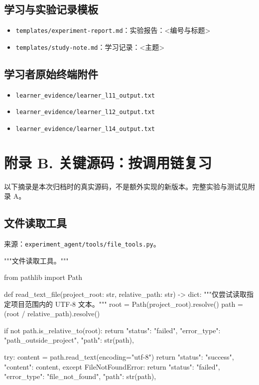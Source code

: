 \subsection{学习与实验记录模板}
\begin{itemize}
\item \nolinkurl{templates/experiment-report.md}：实验报告：<编号与标题>
\item \nolinkurl{templates/study-note.md}：学习记录：<主题>
\end{itemize}

\subsection{学习者原始终端附件}
\begin{itemize}
\item \nolinkurl{learner_evidence/learner_l11_output.txt}
\item \nolinkurl{learner_evidence/learner_l12_output.txt}
\item \nolinkurl{learner_evidence/learner_l14_output.txt}
\end{itemize}

\section{附录 B. 关键源码：按调用链复习}
以下摘录是本次归档时的真实源码，不是额外实现的新版本。完整实验与测试见附录 A。

\subsection{文件读取工具}

来源：\nolinkurl{experiment_agent/tools/file_tools.py}。

\begin{Code}
"""文件读取工具。"""

from pathlib import Path


def read_text_file(project_root: str, relative_path: str) -> dict:
    """仅尝试读取指定项目范围内的 UTF-8 文本。"""
    root = Path(project_root).resolve()
    path = (root / relative_path).resolve()

    if not path.is_relative_to(root):
        return {
            "status": "failed",
            "error_type": "path_outside_project",
            "path": str(path),
        }

    try:
        content = path.read_text(encoding="utf-8")
        return {
            "status": "success",
            "content": content,
        }
    except FileNotFoundError:
        return {
            "status": "failed",
            "error_type": "file_not_found",
            "path": str(path),
        }
\end{Code}

